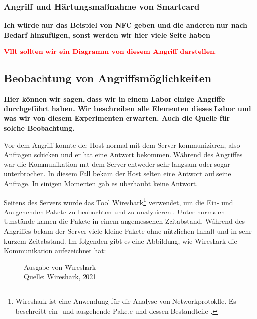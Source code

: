 \subsubsection{Angriff und Härtungsmaßnahme von Smartcard}
\textbf{Ich würde nur das Beispiel von NFC geben und die anderen nur nach Bedarf hinzufügen, sonst werden wir hier
viele Seite haben}

\textcolor{red}{\textbf{Vllt sollten wir ein Diagramm von diesem Angriff darstellen.}}


\subsection{Beobachtung von Angriffsmöglichkeiten}
\textbf{Hier können wir sagen, dass wir in einem Labor einige Angriffe durchgeführt haben. Wir beschreiben alle Elementen
dieses Labor und was wir von diesem Experimenten erwarten. Auch die Quelle für solche Beobachtung.}

Vor dem Angriff konnte der Host normal mit dem Server kommunizieren, also Anfragen schicken und er hat eine Antwort bekommen.
Während des Angriffes war die Kommunikation mit dem Server entweder sehr langsam oder sogar unterbrochen. In diesem Fall
bekam der Host selten eine Antwort auf seine Anfrage. In einigen Momenten gab es überhaubt keine Antwort. 

Seitens des Servers wurde das Tool Wireshark\footnote{Wireshark ist eine Anwendung für die Analyse von Networkprotoklle.
Es beschreibt ein- und ausgehende Pakete und dessen Bestandteile \cite{refst:wisa}.} verwendet, um die Ein- und Ausgehenden
Pakete zu beobachten und zu analysieren \cite{refart:UBEC}. Unter normalen Umstände kamen die Pakete in einem angemessenen
Zeitabstand. Während des Angriffes bekam der Server viele kleine Pakete ohne nützlichen Inhalt und in sehr kurzem Zeitabstand.
Im folgenden gibt es eine Abbildung, wie Wireshark die Kommunikation aufezeichnet hat:

\begin{figure}[H]
  \caption{Ausgabe von Wireshark \\Quelle: Wireshark, 2021}
  \label{fig:refst_wisa}
\end{figure}

